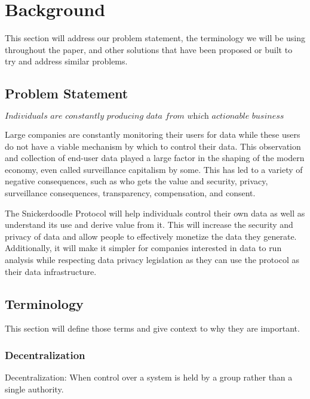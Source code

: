 \section{Background}

This section will address our problem statement, the terminology we will be using throughout the paper, and other solutions that have been proposed or built to try 
and address similar problems. 

\subsection{Problem Statement}


     

$$\textit{Individuals are constantly producing data from which actionable business intelligence is derived but these individuals do not own this value creation}$$

Large companies are constantly monitoring their users for data while these users do not have a viable mechanism by which to control their data. This observation 
and collection of end-user data played a large factor in the shaping of the modern economy, even called surveillance capitalism by some. This has led to a 
variety of negative consequences, such as who gets the value and security, privacy, surveillance consequences, transparency, compensation, and consent. 

The Snickerdoodle Protocol will help individuals control their own data as well as understand its use and derive value from it. This will increase the security 
and privacy of data and allow people to effectively monetize the data they generate. Additionally, it will make it simpler for companies interested in data to 
run analysis while respecting data privacy legislation as they can use the protocol as their data infrastructure.

\subsection{Terminology}

This section will define those terms and give context to why they are important.

\subsubsection{Decentralization}
\begin{definition}
\label{definition:Decentralization}
Decentralization: When control over a system is held by a group rather than a single authority.
\end{definition}

